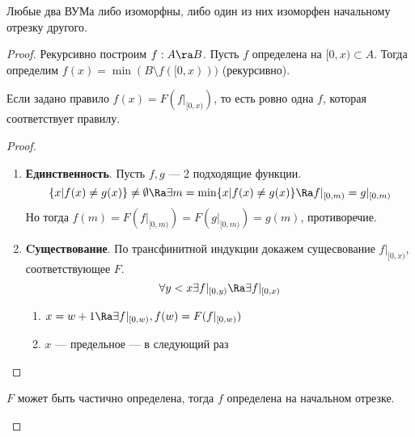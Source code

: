\begin{theorem}
    Любые два ВУМа либо изоморфны, либо один из них изоморфен начальному отрезку другого.
\end{theorem}
\begin{proof}
    Рекурсивно построим \(f: A \ra B\). Пусть \(f\) определена на \([0, x) \subset A\). Тогда определим \(f(x) = \min(B \setminus f([0, x)))\) (рекурсивно). 
    \begin{theorem}
        Если задано правило \(f(x) = F(f|_{[0, x)})\), то есть ровно одна \(f\), которая соответствует правилу.
    \end{theorem}
    \begin{proof}\indent
        \begin{enumerate}
            \item[] \textbf{Единственность}. Пусть \(f, g\) --- 2 подходящие функции.
            \[\{x | f(x) \ne g(x)\} \ne \emptyset \Ra \exists m = \min\{x| f(x) \ne g(x)\} \Ra f|_{[0, m)} = g|_{[0, m)}\]
            Но тогда \(f(m) = F(f|_{[0, m)}) = F(g|_{[0, m)}) = g(m)\), противоречие.

            \item[] \textbf{Cуществование}. По трансфинитной индукции докажем сущесвование \(f|_{[0, x)}\), соответствующее \(F\).
            \[\forall y < x \exists f|_{[0, y)} \Ra \exists f|_{[0, x)}\]
            \begin{enumerate}
                \item \(x = w + 1 \Ra \exists f|_{[0, w)}, f(w) = F(f|_{[0, w)})\)
                \item \(x\) --- предельное --- в следующий раз
            \end{enumerate}
        \end{enumerate}
    \end{proof}
    \begin{theorem}
        \(F\) может быть частично определена, тогда \(f\) определена на начальном отрезке.
    \end{theorem}
\end{proof}